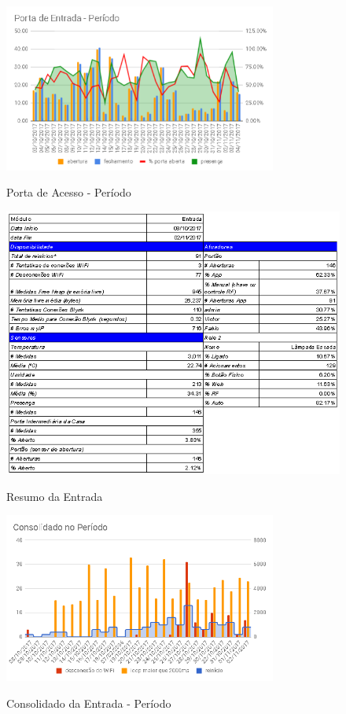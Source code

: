 \begin{figure}[H]
	\centering
	\caption{Porta de Acesso - Período}
	\includegraphics[width=0.8\textwidth]{portaentradaperiodo}
	\label{fig:portaentradaperiodo}
\end{figure}

\begin{figure}[H]
	\centering
	\caption{Resumo da Entrada}
	\includegraphics[width=1.0\textwidth]{resumoEntrada}
	\label{fig:resumoEntrada}
\end{figure}

\begin{figure}[H]
	\centering
	\caption{Consolidado da Entrada - Período}
	\includegraphics[width=0.8\textwidth]{entradaConsolidadoPeriodo}
	\label{fig:entradaConsolidadoPeriodo}
\end{figure}

